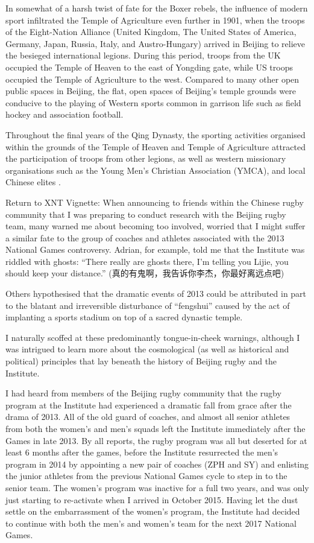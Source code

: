 {In somewhat of a harsh twist of fate for the Boxer rebels, the influence of modern sport infiltrated the Temple of Agriculture even further in 1901, when the troops of the Eight-Nation Alliance (United Kingdom, The United States of America, Germany, Japan, Russia, Italy, and Austro-Hungary) arrived in Beijing to relieve the besieged international legions.  During this period, troops from the UK occupied the Temple of Heaven to the east of Yongding gate, while US troops occupied the Temple of Agriculture to the west. Compared to many other open public spaces in Beijing, the flat, open spaces of Beijing's temple grounds were conducive to the playing of Western sports common in garrison life such as field hockey and association football.

Throughout the final years of the Qing Dynasty, the sporting activities organised within the grounds of the Temple of Heaven and Temple of Agriculture attracted the participation of troops from other legions, as well as western missionary organisations such as the Young Men’s Christian Association (YMCA), and local Chinese elites \citep{Steel1985}.




Return to XNT Vignette:
When announcing to friends within the Chinese rugby community that I was preparing to conduct research with the Beijing rugby team, many warned me about becoming too involved, worried that I might suffer a similar fate to the group of coaches and athletes associated with the 2013 National Games controversy.  Adrian, for example, told me that the Institute was riddled with ghosts: ``There really are ghosts there, I'm telling you Lijie, you should keep your distance.'' (真的有鬼啊，我告诉你李杰，你最好离远点吧)

  Others hypothesised that the dramatic events of 2013 could be attributed in part to the blatant and irreversible disturbance of ``fengshui'' caused by the act of implanting a sports stadium on top of a sacred dynastic temple.

I naturally scoffed at these predominantly tongue-in-cheek warnings, although I was intrigued to learn more about the cosmological (as well as historical and political) principles that lay beneath the history of Beijing rugby and the Institute.

I had heard from members of the Beijing rugby community that the rugby program at the Institute had experienced a dramatic fall from grace after the drama of 2013.  All of the old guard of coaches, and almost all senior athletes from both the women's and men's squads left the Institute immediately after the Games in late 2013.  By all reports, the rugby program was all but deserted for at least 6 months after the games, before the Institute resurrected the men's program in 2014 by appointing a new pair of coaches (ZPH and SY) and enlisting the junior athletes from the previous National Games cycle to step in to the senior team.  The women's program was inactive for a full two years, and was only just starting to re-activate when I arrived in October 2015.  Having let the dust settle on the embarrassment of the women's program, the Institute had decided to continue with both the men's and women's team for the next 2017 National Games.


}
